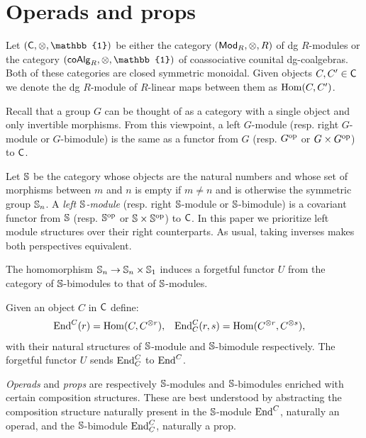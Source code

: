 
\section{Operads and props} \label{s:operads and props}

Let $(\C, \otimes, \mathbb{1})$ be either the category $(\Ch, \otimes, R)$ of dg $R$-modules or the category $(\coAlg_R, \otimes, \mathbb{1})$ of coassociative counital dg-coalgebras.
Both of these categories are closed symmetric monoidal.
Given objects $C, C^\prime \in \C$ we denote the dg $R$-module of $R$-linear maps between them as $\Hom(C, C^\prime)$. 

Recall that a group $G$ can be thought of as a category with a single object and only invertible morphisms. From this viewpoint, a left $G$-module (resp. right $G$-module or $G$-bimodule) is the same as a functor from $G$ (resp. $G^\op$ or $G \times G^\op$) to $\C$.

Let $\S$ be the category whose objects are the natural numbers and whose set of morphisms between $m$ and $n$ is empty if $m \neq n$ and is otherwise the symmetric group $\S_n$.
A \textit{left $\S$-module} (resp. right $\S$-module or $\S$-bimodule) is a covariant functor from $\S$ (resp. $\S^\op$ or $\S \times \S^\op$) to $\C$.
In this paper we prioritize left module structures over their right counterparts. As usual, taking inverses makes both perspectives equivalent.

The homomorphism $\S_n \to \S_n \times \S_1$ induces a forgetful functor $U$ from the category of $\S$-bimodules to that of $\S$-modules.

Given an object $C$ in $\C$ define:
\begin{align*}
\End^C(r) &= \Hom(C, C^{\otimes r}),
&\End^C_C(r, s) &= \Hom(C^{\otimes r}, C^{\otimes s}),
\end{align*}
with their natural structures of $\S$-module and $\S$-bimodule respectively.
The forgetful functor $U$ sends $\End^C_C$ to $\End^C$.

\textit{Operads} and \textit{props} are respectively $\S$-modules and \mbox{$\S$-bimodules} enriched with certain composition structures.
These are best understood by abstracting the composition structure naturally present in the $\S$-module $\End^C$, naturally an operad, and the $\S$-bimodule $\End^C_C$, naturally a prop.

